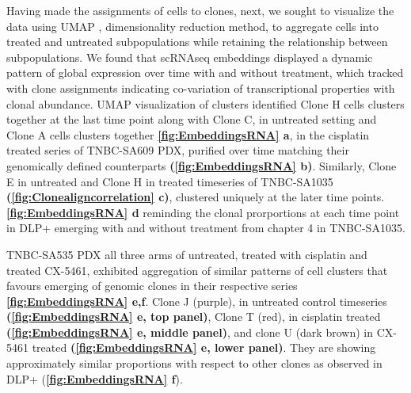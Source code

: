 Having made the assignments of cells to clones, next, we sought to visualize the data using UMAP \cite{becht2019dimensionality}, dimensionality reduction method, to aggregate cells into treated and untreated subpopulations while retaining the relationship between subpopulations. We found that scRNAseq embeddings displayed a dynamic pattern of global expression over time with and without treatment, which tracked with clone assignments indicating co-variation of transcriptional properties with clonal abundance. UMAP visualization of clusters identified Clone H cells clusters together at the last time point along with Clone C, in untreated setting and Clone A cells clusters together \textbf{\autoref{fig:EmbeddingsRNA} a}, in the cisplatin treated series of TNBC-SA609 PDX, purified over time matching their genomically defined counterparts \textbf{(\autoref{fig:EmbeddingsRNA} b)}. Similarly, Clone E in untreated and Clone H in treated timeseries of TNBC-SA1035  \textbf{(\autoref{fig:Clonealigncorrelation} c)}, clustered uniquely at the later time points. \textbf{\autoref{fig:EmbeddingsRNA} d} reminding the clonal prorportions at each time point in DLP+ emerging with and without treatment from chapter 4 in TNBC-SA1035. 

TNBC-SA535 PDX all three arms of untreated, treated with cisplatin and treated CX-5461, exhibited aggregation of similar patterns of cell clusters that favours emerging of genomic clones in their respective series \textbf{\autoref{fig:EmbeddingsRNA} e,f}. Clone J (purple), in untreated control timeseries \textbf{(\autoref{fig:EmbeddingsRNA} e, top panel)}, Clone T (red), in cisplatin treated \textbf{(\autoref{fig:EmbeddingsRNA} e, middle panel)}, and clone U (dark brown) in CX-5461 treated \textbf{(\autoref{fig:EmbeddingsRNA} e, lower panel)}. They are showing approximately similar proportions with respect to other clones as observed in DLP+ (\textbf{\autoref{fig:EmbeddingsRNA} f}).


